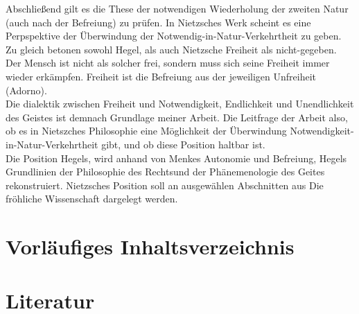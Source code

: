 \documentclass[a4paper, 12pt]{article}
\begin{document}
Abschließend gilt es die These der notwendigen Wiederholung der zweiten Natur (auch nach der Befreiung) zu prüfen. 
In Nietzsches Werk scheint es eine Perpspektive der Überwindung der Notwendig-in-Natur-Verkehrtheit zu geben. 
Zu gleich betonen sowohl Hegel, als auch Nietzsche Freiheit als nicht-gegeben. 
Der Mensch ist nicht als solcher frei, sondern muss sich seine Freiheit immer wieder erkämpfen.
Freiheit ist die Befreiung aus der jeweiligen Unfreiheit (Adorno).\\
Die dialektik zwischen Freiheit und Notwendigkeit, Endlichkeit und Unendlichkeit des Geistes ist demnach Grundlage meiner Arbeit.
Die Leitfrage der Arbeit also, ob es in Nietszches Philosophie eine Möglichkeit der Überwindung Notwendigkeit-in-Natur-Verkehrtheit gibt, und ob diese Position haltbar ist.\\
Die Position Hegels, wird anhand von Menkes \glqq Autonomie und Befreiung\grqq, Hegels \glqq Grundlinien der Philosophie des Rechts\grqq und der \glqq Phänemenologie des Geites\grqq{} rekonstruiert.
Nietzsches Position soll an ausgewählen Abschnitten aus \glqq Die fröhliche Wissenschaft\grqq{} dargelegt werden.

\section{Vorläufiges Inhaltsverzeichnis}

\section{Literatur}
 
\end{document}

